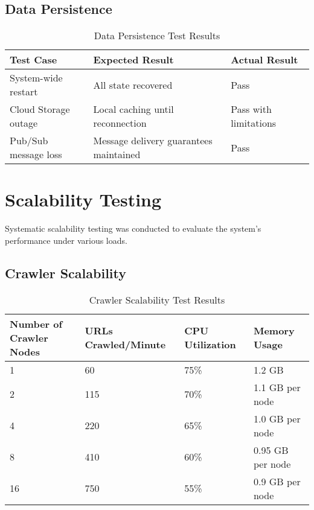 \documentclass[12pt,a4paper]{report}
\begin{document}
\subsection{Data Persistence}
\begin{table}[H]
    \centering
    \begin{tabularx}{\textwidth}{|X|X|X|}
        \hline
        \textbf{Test Case} & \textbf{Expected Result} & \textbf{Actual Result} \\
        \hline
        System-wide restart & All state recovered & Pass \\
        \hline
        Cloud Storage outage & Local caching until reconnection & Pass with limitations \\
        \hline
        Pub/Sub message loss & Message delivery guarantees maintained & Pass \\
        \hline
    \end{tabularx}
    \caption{Data Persistence Test Results}
\end{table}

\section{Scalability Testing}
Systematic scalability testing was conducted to evaluate the system's performance under various loads.

\subsection{Crawler Scalability}
\begin{table}[H]
    \centering
    \begin{tabularx}{\textwidth}{|X|X|X|X|}
        \hline
        \textbf{Number of Crawler Nodes} & \textbf{URLs Crawled/Minute} & \textbf{CPU Utilization} & \textbf{Memory Usage} \\
        \hline
        1 & 60 & 75\% & 1.2 GB \\
        \hline
        2 & 115 & 70\% & 1.1 GB per node \\
        \hline
        4 & 220 & 65\% & 1.0 GB per node \\
        \hline
        8 & 410 & 60\% & 0.95 GB per node \\
        \hline
        16 & 750 & 55\% & 0.9 GB per node \\
        \hline
    \end{tabularx}
    \caption{Crawler Scalability Test Results}
\end{table}
\end{document}
